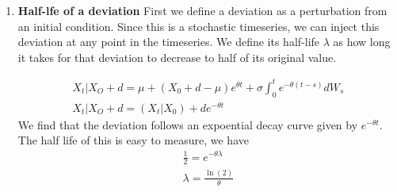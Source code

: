 \documentclass{article}
\begin{document}
\begin{enumerate}
            \begin{gather*} 
                \Var(X_t) = E(X_t^2) - E(X_t)^2
                \\
                = E\left(\alpha^2 + 2\alpha\beta + \beta^2 \right)- \alpha^2
                \\
                =  E(\beta^2)
                \\
                = \frac{\sigma^2}{2\theta}\left[1 -  e^{-2\theta t}\right]
            \end{gather*}
            This implies that the stationary distribution for $\lim_{t\to\infty}
            X_t$ is 
            \begin{gather*}
                \lim_{t\to\infty} X_t \sim N\left(\mu,
                \frac{\sigma^2}{2\theta}\right)
            \end{gather*}
        \item \textbf{Half-lfe of a deviation} First we define a deviation as a
        perturbation from an initial condition. Since this is a stochastic
        timeseries, we can inject this deviation at any point in the timeseries.
        We define its half-life $\lambda$ as how long it takes for that deviation to
        decrease to half of its original value. 

        \begin{gather*}
            X_t | X_O + d = \mu + (X_0 + d - \mu) e^{\theta t} + \sigma
            \int_0^{t} e^{-\theta (t - s)}dW_s
            \\
            X_t | X_O + d = \left(X_t | X_0\right) + d e^{-\theta t}
        \end{gather*}
        We find that the deviation follows an expoential decay curve given by
        $e^{-\theta t}$. The half life of this is easy to measure, we have
        \begin{gather*}
            \frac{1}{2} = e^{-\theta \lambda}
            \\
            \lambda = \frac{\ln(2)}{\theta}
        \end{gather*}


\end{enumerate}
\end{document}
